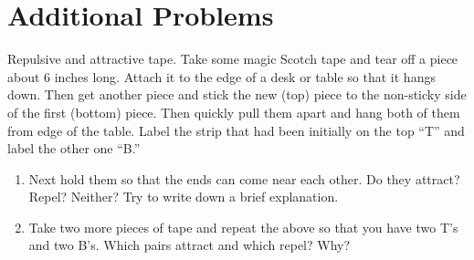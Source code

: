 \chapter*{Additional Problems}


\begin{aproblem}{Repulsive and attractive tape.}  
  Take some magic Scotch tape and tear off a piece about 6 inches
  long.  Attach it to the edge of a desk or table so that it hangs
  down.  Then get another piece and stick the new (top) piece to the
  non-sticky side of the first (bottom) piece. Then quickly pull them
  apart and hang both of them from edge of the table.  Label the strip
  that had been initially on the top ``T'' and label the other one
  ``B.''
  \begin{enumerate} 
  \item Next hold them so that the ends can come near each other.  Do
    they attract?  Repel?  Neither?  Try to write down a brief
    explanation.
  \item Take two more pieces of tape and repeat the above so that you
    have two T's and two B's.  Which pairs attract and which repel?
    Why?
  \end{enumerate}
\end{aproblem}

